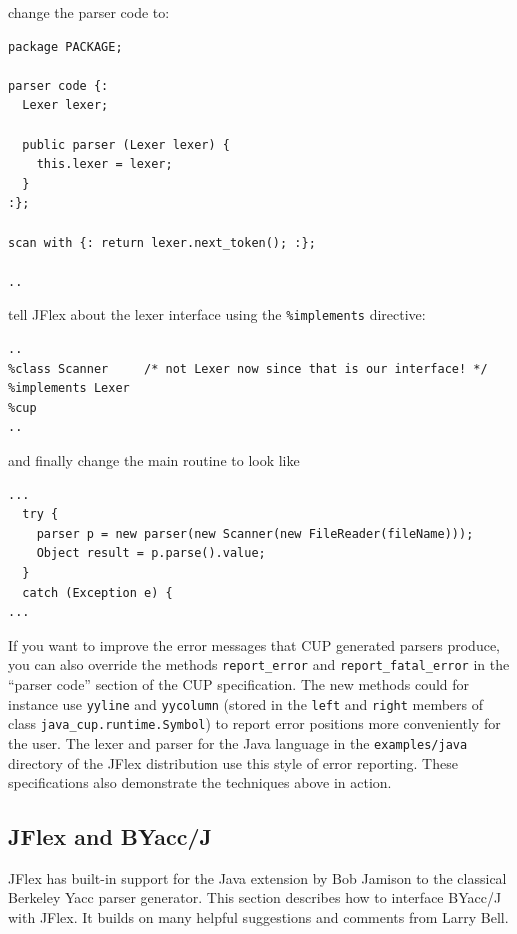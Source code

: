 \documentclass[11pt]{scrartcl}
\newcommand{\xsmall}{}
\begin{document}
change the parser code to:

{\xsmall\begin{verbatim}
package PACKAGE;

parser code {:
  Lexer lexer;

  public parser (Lexer lexer) {
    this.lexer = lexer;
  }
:};

scan with {: return lexer.next_token(); :};

..
\end{verbatim}
}

tell JFlex about the lexer 
interface using the \texttt{\%implements}
directive:

{\xsmall\begin{verbatim}
..
%class Scanner     /* not Lexer now since that is our interface! */
%implements Lexer
%cup
..
\end{verbatim}
}

and finally change the main routine to look like

{\xsmall\begin{verbatim}
...
  try {
    parser p = new parser(new Scanner(new FileReader(fileName)));
    Object result = p.parse().value;
  }
  catch (Exception e) {
...
\end{verbatim}
}

If you want to improve the error messages that CUP generated parsers
produce, you can also override the methods \texttt{report\_error} and \texttt{report\_fatal\_error}
in the ``parser code'' section of the CUP specification. The new methods
could for instance use \texttt{yyline} and \texttt{yycolumn} (stored in
the \texttt{left} and \texttt{right} members of class \texttt{java\_cup.runtime.Symbol})
to report error positions more conveniently for the user. The lexer and
parser for the Java language in the \texttt{examples/java} directory of the
JFlex distribution use this style of error reporting. These specifications
also demonstrate the techniques above in action.

\subsection{JFlex and BYacc/J\label{YaccWork}}

JFlex has built-in support for the Java extension 
\cite{BYaccJ} by Bob Jamison
to the classical Berkeley Yacc parser generator.
This section describes how to interface BYacc/J with JFlex. It
builds on many helpful suggestions and comments from Larry Bell.
\end{document}
